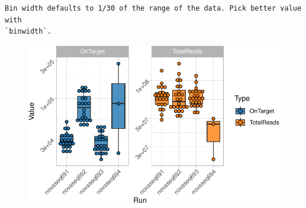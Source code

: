 \documentclass[
  letterpaper,
  DIV=11,
  numbers=noendperiod]{scrartcl}
\begin{document}
\begin{verbatim}
Bin width defaults to 1/30 of the range of the data. Pick better value with
`binwidth`.
\end{verbatim}

\begin{figure}[H]

{\centering \includegraphics{InformeNeiker_files/figure-pdf/unnamed-chunk-4-2.pdf}

}

\end{figure}
\end{document}
